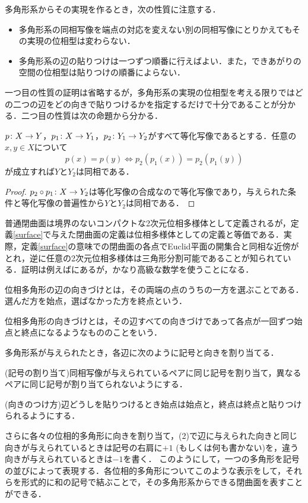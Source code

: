 \documentclass[dvipdfmx,uplatex]{jsarticle}
\begin{document}
多角形系からその実現を作るとき，次の性質に注意する．
\begin{itemize}
\item 多角形系の同相写像を端点の対応を変えない別の同相写像にとりかえてもその実現の位相型は変わらない．
\item 多角形系の辺の貼りつけは一つずつ順番に行えばよい．また，できあがりの空間の位相型は貼りつけの順番によらない．
\end{itemize}
一つ目の性質の証明は省略するが，多角形系の実現の位相型を考える限りではどの二つの辺をどの向きで貼りつけるかを指定するだけで十分であることが分かる．二つ目の性質は次の命題から分かる．

\begin{proposition}
$p\colon X\to Y$，$p_1\colon X\to Y_1$，$p_2\colon Y_1\to Y_2$がすべて等化写像であるとする．任意の$x,y\in X$について
\[ p(x)=p(y) \iff p_2(p_1(x))=p_2(p_1(y)) \]
が成立すれば$Y$と$Y_2$は同相である．
\end{proposition}
\begin{proof}
$p_2\circ p_1\colon X\to Y_2$は等化写像の合成なので等化写像であり，与えられた条件と等化写像の普遍性から$Y$と$Y_2$は同相である．
\end{proof}

\begin{remark}
普通閉曲面は境界のないコンパクトな2次元位相多様体として定義されるが，定義\ref{surface}で与えた閉曲面の定義は位相多様体としての定義と等価である．実際，定義\ref{surface}の意味での閉曲面の各点でEuclid平面の開集合と同相な近傍がとれ，逆に任意の2次元位相多様体は三角形分割可能であることが知られている．証明は例えば\cite{triangle}にあるが，かなり高級な数学を使うことになる．
\end{remark}

\begin{definition}
\begin{enumarabicp}
\item 位相多角形の辺の向きづけとは，その両端の点のうちの一方を選ぶことである．選んだ方を始点，選ばなかった方を終点という．
\item 位相多角形の向きづけとは，その辺すべての向きづけであって各点が一回ずつ始点と終点になるようなもののことをいう．
\end{enumarabicp}
\end{definition}

多角形系が与えられたとき，各辺に次のように記号と向きを割り当てる．
\begin{enumromanp}
\item (記号の割り当て)同相写像が与えられているペアに同じ記号を割り当て，異なるペアに同じ記号が割り当てられないようにする．
\item (向きのつけ方)辺どうしを貼りつけるとき始点は始点と，終点は終点と貼りつけられるようにする．
\end{enumromanp}
さらに各々の位相的多角形に向きを割り当て，(2)で辺に与えられた向きと同じ向きが与えられているときは記号の右肩に$+1$ (もしくは何も書かない)を，違う向きが与えられているときは$-1$を書く．
このようにして，一つの多角形を記号の並びによって表現する．各位相的多角形についてこのような表示をして，それらを形式的に和の記号で結ぶことで，その多角形系からできる閉曲面を表すことができる．
\end{document}
